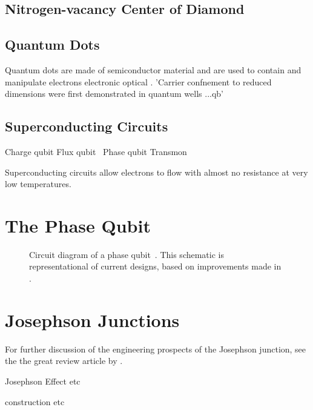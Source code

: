 \subsection{Nitrogen-vacancy Center of Diamond}

\subsection{Quantum Dots}
Quantum dots are made of semiconductor material and are used to contain and manipulate electrons electronic \cite{Chang1974} optical \cite{Dingle1974}. 'Carrier confnement to reduced dimensions were first demonstrated in quantum wells ...qb'

\subsection{Superconducting Circuits}
    Charge qubit Flux qubit~\cite{Plourde2005, Deppe2007}  Phase qubit
Transmon\cite{Wallraff2004, Schreier2008} 

Superconducting circuits allow electrons to flow with almost no resistance at very low temperatures.

\section{The Phase Qubit}

\begin{figure}[htp]
\resizebox{0.75\textwidth}{!}{}
\caption[Phase Qubit Circuit Diagram]{\label{fig:qubit}Circuit diagram of a phase qubit~\cite{Clarke1988,Martinis2002}. This schematic is representational of current designs, based on improvements made in .}
\end{figure}


\section{Josephson Junctions}
For further discussion of the engineering prospects of the Josephson junction, see the the great review article by \citeauthor{Makhlin2001}\cite{Makhlin2001}.

Josephson Effect etc

construction etc

